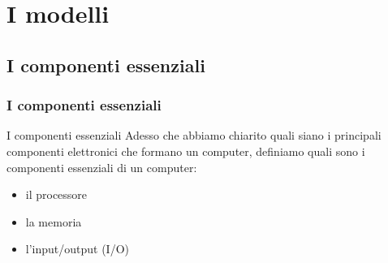 \section[I modelli]{I modelli}
\label{sec:models}


\subsection[I componenti essenziali]{I componenti essenziali}
\begin{frame}
	\frametitle{I componenti essenziali}
	
	\begin{block}{I componenti essenziali}
		Adesso che abbiamo chiarito quali siano i principali componenti elettronici che formano un computer, definiamo quali sono i componenti essenziali di un computer:
		\begin{itemize}
			\item il processore
			\item la memoria
			\item l'input/output (I/O)
		\end{itemize}
		
	\end{block}
	
\end{frame}



%	
%	
%	


